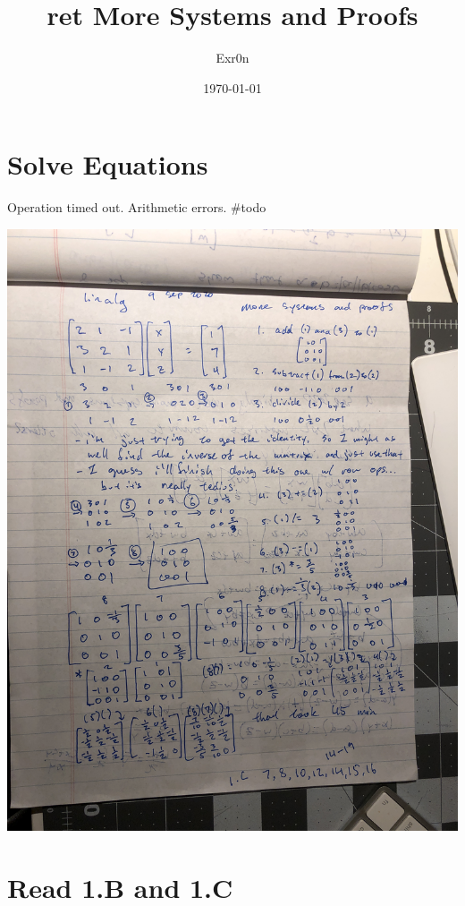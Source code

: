 \documentclass[letterpaper]{article}
\author{Exr0n}
\date{\today}
\title{ret More Systems and Proofs}
\renewcommand{\tableofcontents}{}
\begin{document}
\tableofcontents



\section{Solve Equations}
\label{sec:org5b26f04}
Operation timed out. Arithmetic errors. \#todo

\begin{center}
\includegraphics[width=.9\linewidth]{IMG_1379.jpg}
\end{center}

\section{Read 1.B and 1.C}
\label{sec:org99f15f7}
\end{document}
